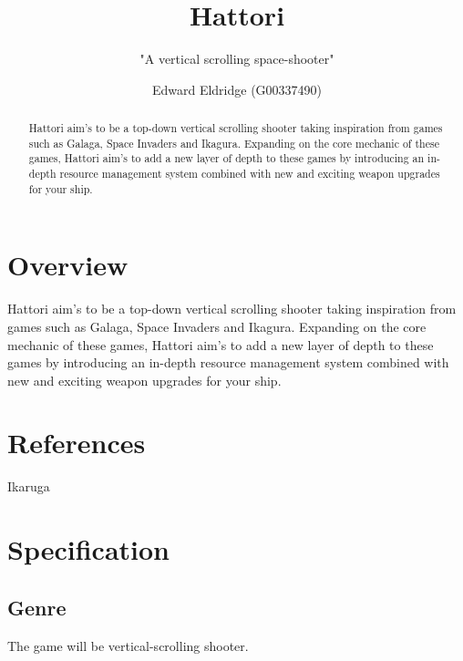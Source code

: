 \documentclass[a4paper]{scrreprt}
\title{Hattori}
\subtitle{"A vertical scrolling space-shooter"}
\author{Edward Eldridge (G00337490)}
\begin{document}
\maketitle

\begin{abstract}

  Hattori aim's to be a top-down vertical scrolling shooter taking inspiration from games such as Galaga, Space Invaders and Ikagura.
  Expanding on the core mechanic of these games, Hattori aim's to
  add a new layer of depth to these games by introducing an in-depth resource management system combined with new and exciting weapon upgrades for your ship. 

\end{abstract}

{
  \hypersetup{linkcolor=black}
  \tableofcontents
}

\chapter{Overview}

Hattori aim's to be a top-down vertical scrolling shooter taking inspiration from games such as Galaga, Space Invaders and Ikagura.
Expanding on the core mechanic of these games, Hattori aim's to
add a new layer of depth to these games by introducing an in-depth resource management system combined with new and exciting weapon upgrades for your ship. 


\chapter{References} 
Ikaruga


\chapter{Specification}

\section{Genre}
The game will be vertical-scrolling shooter.
\end{document}
